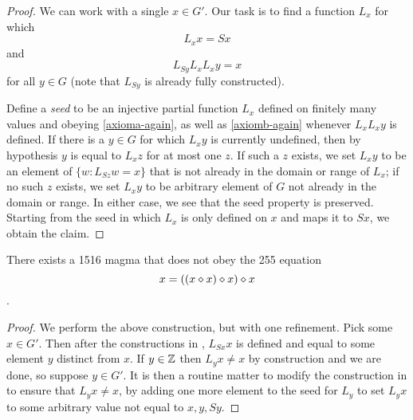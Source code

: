 \begin{proof}  We can work with a single $x \in G'$.  Our task is to find a function $L_x$ for which
\begin{equation}\label{axioma-again}
   L_x x = Sx
\end{equation}
and
\begin{equation}\label{axiomb-again}
  L_{Sy} L_x L_x y = x
\end{equation}
for all $y \in G$ (note that $L_{Sy}$ is already fully constructed).

Define a \emph{seed} to be an injective partial function $L_x$ defined on finitely many values and obeying \eqref{axioma-again}, as well as \eqref{axiomb-again} whenever $L_x L_x y$ is defined.  If there is a $y \in G$ for which $L_x y$ is currently undefined, then by hypothesis $y$ is equal to $L_x z$ for at most one $z$.  If such a $z$ exists, we set $L_x y$ to be an element of $\{ w: L_{Sz} w = x \}$ that is not already in the domain or range of $L_x$; if no such $z$ exists, we set $L_x y$ to be arbitrary element of $G$ not already in the domain or range.  In either case, we see that the seed property is preserved.  Starting from the seed in which $L_x$ is only defined on $x$ and maps it to $Sx$, we obtain the claim.
\end{proof}

\begin{corollary}\label{1516-no-255}  There exists a 1516 magma that does not obey the 255 equation $$x = ((x \diamond x) \diamond x) \diamond x$$.
\end{corollary}

\begin{proof}  We perform the above construction, but with one refinement.  Pick some $x \in G'$.  Then after the constructions in , $L_{Sx} x$ is defined and equal to some element $y$ distinct from $x$. If $y \in \mathbb{Z}$ then $L_y x \neq x$ by construction and we are done, so suppose $y \in G'$.  It is then a routine matter to modify the construction in  to ensure that $L_y x \neq x$, by adding one more element to the seed for $L_y$ to set $L_y x$ to some arbitrary value not equal to $x, y, Sy$.
\end{proof}
